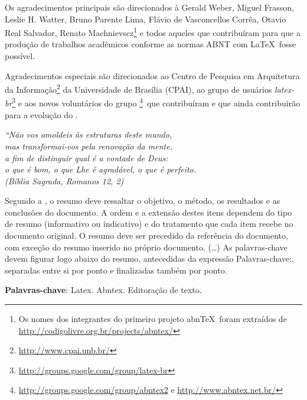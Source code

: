 \documentclass[
	12pt,				%
	openright,			%
	twoside,			%
	a4paper,			%
	chapter=TITLE,		%
	english,			%
	brazil				%
	]{abntex2}
\begin{document}
\begin{agradecimentos}
Os agradecimentos principais são direcionados à Gerald Weber, Miguel Frasson,
Leslie H. Watter, Bruno Parente Lima, Flávio de Vasconcellos Corrêa, Otavio Real
Salvador, Renato Machnievscz\footnote{Os nomes dos integrantes do primeiro
projeto abn\TeX\ foram extraídos de
\url{http://codigolivre.org.br/projects/abntex/}} e todos aqueles que
contribuíram para que a produção de trabalhos acadêmicos conforme
as normas ABNT com \LaTeX\ fosse possível.

Agradecimentos especiais são direcionados ao Centro de Pesquisa em Arquitetura
da Informação\footnote{\url{http://www.cpai.unb.br/}} da Universidade de
Brasília (CPAI), ao grupo de usuários
\emph{latex-br}\footnote{\url{http://groups.google.com/group/latex-br}} e aos
novos voluntários do grupo
\emph{\abnTeX}\footnote{\url{http://groups.google.com/group/abntex2} e
\url{http://www.abntex.net.br/}}~que contribuíram e que ainda
contribuirão para a evolução do \abnTeX.

\end{agradecimentos}

\begin{epigrafe}
    \vspace*{\fill}
	\begin{flushright}
		\textit{``Não vos amoldeis às estruturas deste mundo, \\
		mas transformai-vos pela renovação da mente, \\
		a fim de distinguir qual é a vontade de Deus: \\
		o que é bom, o que Lhe é agradável, o que é perfeito.\\
		(Bíblia Sagrada, Romanos 12, 2)}
	\end{flushright}
\end{epigrafe}


\setlength{\absparsep}{18pt} %
\begin{resumo}
 Segundo a , o resumo deve ressaltar o
 objetivo, o método, os resultados e as conclusões do documento. A ordem e a extensão
 destes itens dependem do tipo de resumo (informativo ou indicativo) e do
 tratamento que cada item recebe no documento original. O resumo deve ser
 precedido da referência do documento, com exceção do resumo inserido no
 próprio documento. (\ldots) As palavras-chave devem figurar logo abaixo do
 resumo, antecedidas da expressão Palavras-chave:, separadas entre si por
 ponto e finalizadas também por ponto.
 
 \textbf{Palavras-chave}: Latex. Abntex. Editoração de texto.
\end{resumo}
\end{document}
